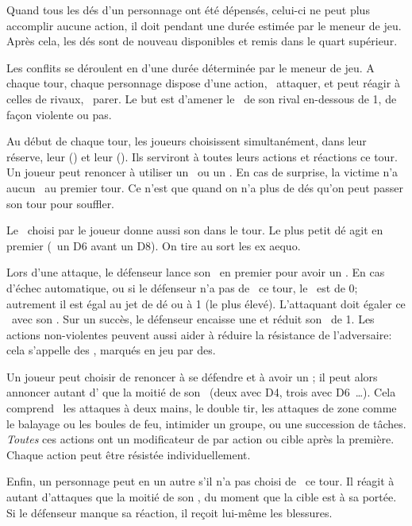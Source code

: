 {		Quand tous les dés d'un personnage ont été dépensés, celui-ci ne peut plus accomplir aucune action, il doit  pendant une durée estimée par le meneur de jeu. Après cela, les dés sont de nouveau disponibles et remis dans le quart supérieur.


		\noindent
		Les conflits se déroulent en  d'une durée déterminée par le meneur de jeu. A chaque tour, chaque personnage dispose d'une action, \pe\ attaquer, et peut réagir à celles de rivaux, \pe\ parer. Le but est d'amener le \HD\ de son rival en-dessous de 1, de façon violente ou pas.

		Au début de chaque tour, les joueurs choisissent simultanément, dans leur réserve, leur  (\AD) et leur  (\RD). Ils serviront à toutes leurs actions et réactions ce tour. Un joueur peut renoncer à utiliser un \AD\ ou un \RD. En cas de surprise, la victime n'a aucun \AD\ au premier tour. Ce n'est que quand on n'a plus de dés qu'on peut passer son tour pour souffler.

		Le \AD\ choisi par le joueur donne aussi son  dans le tour. Le plus petit dé agit en premier (\pe\ un D6 avant un D8). On tire au sort les ex aequo.

		Lors d'une attaque, le défenseur lance son \RD\ en premier pour avoir un \TN. En cas d'échec automatique, ou si le défenseur n'a pas de \RD\ ce tour, le \TN\ est de 0; autrement il est égal au jet de dé ou à 1 (le plus élevé). L'attaquant doit égaler ce \TN\ avec son \AD. Sur un succès, le défenseur encaisse une  et réduit son \HD\ de 1. Les actions non-violentes peuvent aussi aider à réduire la résistance de l'adversaire: cela s'appelle des , marqués en jeu par des.

		Un joueur peut choisir de renoncer à se défendre et à avoir un \RD; il peut alors annoncer autant d' que la moitié de son \AD\ (deux avec D4, trois avec D6~\ldots). Cela comprend \pe\ les attaques à deux mains, le double tir, les attaques de zone comme le balayage ou les boules de feu, intimider un groupe, ou une succession de tâches. \emph{Toutes} ces actions ont un modificateur de  par action ou cible après la première. Chaque action peut être résistée individuellement.

		Enfin, un personnage peut en  un autre s'il n'a pas choisi de \AD\ ce tour. Il réagit à autant d'attaques que la moitié de son \RD, du moment que la cible est à sa portée. Si le défenseur manque sa réaction, il reçoit lui-même les blessures.

}
